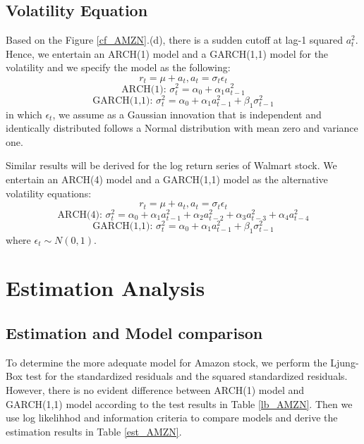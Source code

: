 \documentclass[paper=a4, fontsize=11pt]{article}
\begin{document}
\subsection{Volatility Equation}
Based on the Figure \ref{cf_AMZN}.(d), there is a sudden cutoff at lag-1 squared $a_t^2$. Hence, we entertain an ARCH(1) model and a GARCH(1,1) model for the volatility and we specify the model as the following:
\[ r_t = \mu+a_t, a_t = \sigma_t \epsilon_t \]
\[ \text{ARCH(1): } \sigma_t^2 = \alpha_0+\alpha_1 a_{t-1}^2 \]
\[ \text{GARCH(1,1): } \sigma_t^2= \alpha_0+\alpha_1 a_{t-1}^2+\beta_1 \sigma_{t-1}^2 \]
in which $\epsilon_t$, we assume as a Gaussian innovation that is independent and identically distributed follows a Normal distribution with mean zero and variance one.

Similar results will be derived for the log return series of Walmart stock. We entertain an ARCH(4) model and a GARCH(1,1) model as the alternative volatility equations:
\[ r_t = \mu+a_t, a_t = \sigma_t \epsilon_t \]
\[ \text{ARCH(4): } \sigma_t^2 = \alpha_0+\alpha_1 a_{t-1}^2+\alpha_2 a_{t-2}^2+\alpha_3 a_{t-3}^2+\alpha_4 a_{t-4}^2 \]
\[ \text{GARCH(1,1): } \sigma_t^2= \alpha_0+\alpha_1 a_{t-1}^2+\beta_1 \sigma_{t-1}^2 \]
where $\epsilon_t \sim N(0,1)$.


\section{Estimation Analysis}
\subsection{Estimation and Model comparison}
To determine the more adequate model for Amazon stock, we perform the Ljung-Box test for the standardized residuals and the squared standardized residuals. However, there is no evident difference between ARCH(1) model and GARCH(1,1) model according to the test results in Table \ref{lb_AMZN}. Then we use log likelihhod and information criteria to compare models and derive the estimation results in Table \ref{est_AMZN}.
\end{document}
